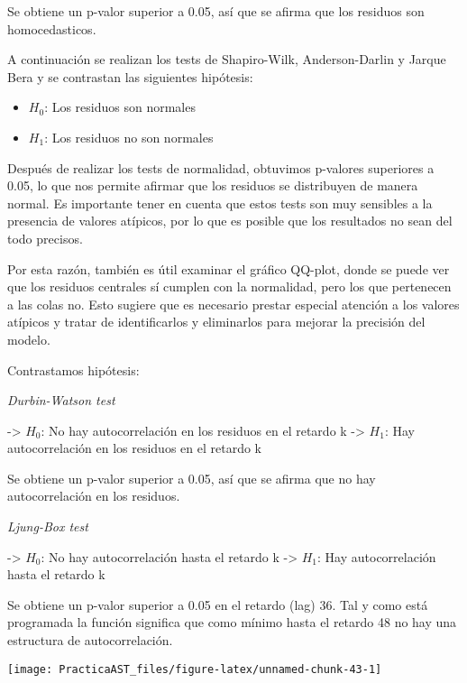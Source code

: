 \documentclass[
]{article}
\providecommand{\tightlist}{%
  \setlength{\itemsep}{0pt}\setlength{\parskip}{0pt}}
\begin{document}
Se obtiene un p-valor superior a 0.05, así que se afirma que los
residuos son homocedasticos.

\medskip

A continuación se realizan los tests de Shapiro-Wilk, Anderson-Darlin y
Jarque Bera y se contrastan las siguientes hipótesis:

\begin{itemize}
\tightlist
\item
  \(H_0\): Los residuos son normales
\item
  \(H_1\): Los residuos no son normales
\end{itemize}

Después de realizar los tests de normalidad, obtuvimos p-valores
superiores a 0.05, lo que nos permite afirmar que los residuos se
distribuyen de manera normal. Es importante tener en cuenta que estos
tests son muy sensibles a la presencia de valores atípicos, por lo que
es posible que los resultados no sean del todo precisos.

Por esta razón, también es útil examinar el gráfico QQ-plot, donde se
puede ver que los residuos centrales sí cumplen con la normalidad, pero
los que pertenecen a las colas no. Esto sugiere que es necesario prestar
especial atención a los valores atípicos y tratar de identificarlos y
eliminarlos para mejorar la precisión del modelo.

\medskip

Contrastamos hipótesis:

\emph{Durbin-Watson test}

-\textgreater{} \(H_0\): No hay autocorrelación en los residuos en el
retardo k -\textgreater{} \(H_1\): Hay autocorrelación en los residuos
en el retardo k

Se obtiene un p-valor superior a 0.05, así que se afirma que no hay
autocorrelación en los residuos.

\emph{Ljung-Box test}

-\textgreater{} \(H_0\): No hay autocorrelación hasta el retardo k
-\textgreater{} \(H_1\): Hay autocorrelación hasta el retardo k

Se obtiene un p-valor superior a 0.05 en el retardo (lag) 36. Tal y como
está programada la función significa que como mínimo hasta el retardo 48
no hay una estructura de autocorrelación.

\begin{center}\texttt{[image: PracticaAST\_files/figure-latex/unnamed-chunk-43-1]} \end{center}
\end{document}
